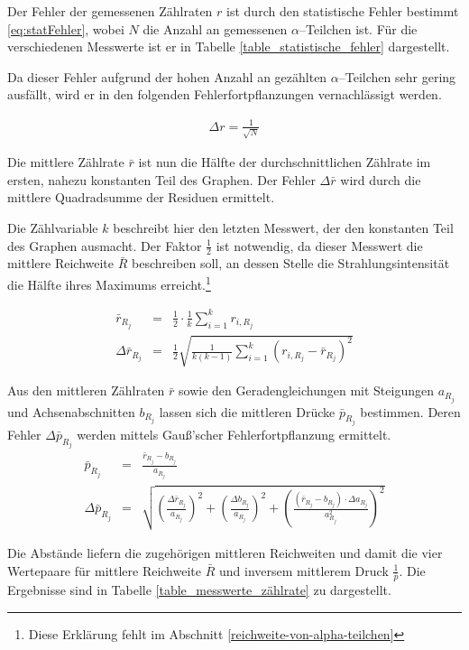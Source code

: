 \documentclass[12pt,a4paper]{scrartcl}
\numberwithin{equation}{section} %
\begin{document}
Der Fehler der gemessenen Zählraten $r$ ist durch den statistische Fehler bestimmt \eqref{eq:statFehler}, wobei $N$ die Anzahl an gemessenen $\alpha$--Teilchen ist. Für die verschiedenen Messwerte ist er in Tabelle \ref{table_statistische_fehler} dargestellt.

Da dieser Fehler aufgrund der hohen Anzahl an gezählten $\alpha$--Teilchen sehr gering ausfällt, wird er in den folgenden Fehlerfortpflanzungen vernachlässigt werden.

\begin{eqnarray}
	\Delta r = \frac{1}{\sqrt{N}}
	\label{eq:statFehler}
\end{eqnarray}

\noindent
Die mittlere Zählrate $\bar{r}$ ist nun die Hälfte der durchschnittlichen Zählrate im ersten, nahezu konstanten Teil des Graphen. Der Fehler $\Delta \bar{r}$ wird durch die mittlere Quadradsumme der Residuen ermittelt.

Die Zählvariable $k$ beschreibt hier den letzten Messwert, der den konstanten Teil des Graphen ausmacht. Der Faktor $\frac{1}{2}$ ist notwendig, da dieser Messwert die mittlere Reichweite $\bar R$ beschreiben soll, an dessen Stelle die Strahlungsintensität die Hälfte ihres Maximums erreicht.\footnote{Diese Erklärung fehlt im Abschnitt \ref{reichweite-von-alpha-teilchen}}

\begin{eqnarray}
	\bar{r}_{R_j} &=& \frac{1}{2} \cdot \frac{1}{k} \sum_{i=1}^{k} r_{i,R_j} \\
	\Delta \bar{r}_{R_j} &=& \frac{1}{2} \sqrt{\frac{1}{k (k-1)} \sum_{i=1}^{k} (r_{i,R_j} - \bar{r}_{R_j})^2}
\end{eqnarray}

\noindent
Aus den mittleren Zählraten $\bar r$ sowie den Geradengleichungen mit Steigungen $a_{R_j}$ und Achsenabschnitten $b_{R_j}$ lassen sich die mittleren Drücke $\bar{p}_{R_j}$ bestimmen. Deren Fehler $\Delta \bar p_{R_j}$ werden mittels Gauß'scher Fehlerfortpflanzung ermittelt.
\begin{eqnarray}
	\bar{p}_{R_j} &=& \frac{\bar{r}_{R_j} - b_{R_j}}{a_{R_j}} \\
	\Delta \bar{p}_{R_j} &=& \sqrt{\left(\frac{\Delta \bar{r}_{R_j}}{a_{R_j}}\right)^2 + \left(\frac{\Delta b_{R_j}}{a_{R_j}}\right)^2 + \left(\frac{(\bar{r}_{R_j} - b_{R_j}) \cdot \Delta a_{R_j}}{a_{R_j}^2}\right)^2}
\end{eqnarray}

\noindent
Die Abstände liefern die zugehörigen mittleren Reichweiten und damit die vier Wertepaare für mittlere Reichweite $\bar{R}$ und inversem mittlerem Druck $\frac{1}{\bar{p}}$. Die Ergebnisse sind in Tabelle \ref{table_messwerte_zählrate} zu dargestellt.
\end{document}
